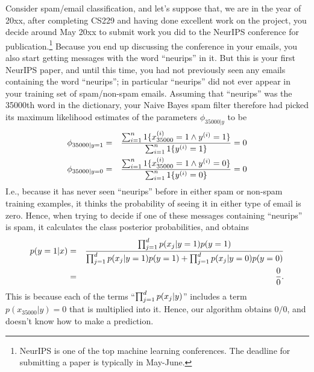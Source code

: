 \documentclass{article}
\begin{document}
Consider spam/email classification, and let's suppose that, we are in the year of 20xx, after completing CS229 and having
done excellent work on the project, you decide around May 20xx to submit
work you did to the NeurIPS conference for publication.\footnote{NeurIPS is one of the top machine learning conferences.  The deadline for submitting a
paper is typically in May-June.}  Because you end up discussing the conference in
your emails, you also start getting messages with the word ``neurips'' in it.  But this is your first
NeurIPS paper, and until this time, you had not previously seen any emails containing the word ``neurips'';
in particular ``neurips'' did not ever appear in your training set of spam/non-spam emails.
Assuming that ``neurips'' was the
35000th word in the dictionary, your Naive Bayes spam filter therefore had picked its
maximum likelihood estimates of the parameters $\phi_{35000|y}$ to be
\begin{eqnarray*}
\phi_{35000|y=1} &=& \frac{\sum_{i=1}^{n} 1\{x^{(i)}_{35000} =1 \wedge {y^{(i)}}=1\}}{\sum_{i=1}^{n} 1\{{y^{(i)}}=1\}} = 0\\
\phi_{35000|y=0} &=& \frac{\sum_{i=1}^{n} 1\{x^{(i)}_{35000} =1 \wedge {y^{(i)}}=0\}}{\sum_{i=1}^{n} 1\{{y^{(i)}}=0\}} = 0
\end{eqnarray*}
I.e., because it has never seen ``neurips'' before in either spam or non-spam training examples, it thinks
the probability of seeing it in either type of email is zero.  Hence, when trying to decide if
one of these messages containing ``neurips'' is spam, it calculates the
class posterior probabilities, and obtains
\begin{eqnarray*}
p(y=1|x)
&=& \frac{\prod_{j=1}^{d} p(x_j|y=1) p(y=1)}{\prod_{j=1}^{d} p(x_j|y=1) p(y=1) + \prod_{j=1}^{d} p(x_j|y=0) p(y=0)} \\
&=& \frac{0}{0}.
\end{eqnarray*}
This is because each of the terms ``$\prod_{j=1}^{d} p(x_j|y)$'' includes a term $p(x_{35000}|y) = 0$ that
is multiplied into it.  Hence, our algorithm obtains $0/0$, and doesn't know how to make a prediction.
\end{document}
